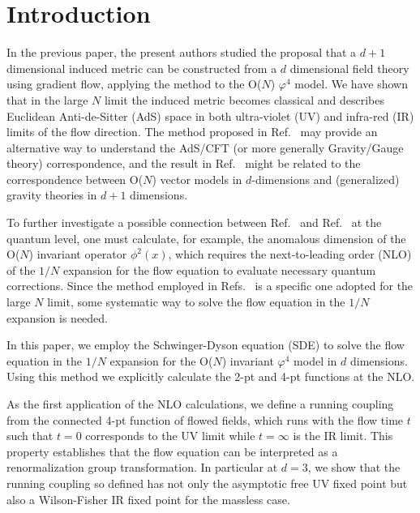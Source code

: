 \documentclass[preprint]{ptephy_v1}%
\begin{document}

\maketitle

\section{Introduction}
\label{sec:intro}
In the previous paper\cite{Aoki:2016ohw}, 
the present authors studied the proposal\cite{Aoki:2015dla} that a $d+1$ dimensional induced metric 
can be constructed from a $d$ dimensional field theory using gradient flow\cite{Narayanan:2006rf,Luscher:2010iy, Luscher:2009eq,Luscher:2013vga}, applying the method to  the O($N$) $\varphi^4$ model.
We have shown that in the large $N$ limit the induced metric becomes classical and describes Euclidean 
Anti-de-Sitter (AdS) space in both ultra-violet (UV) and infra-red (IR) 
limits of the flow direction.
The method proposed in Ref.~\cite{Aoki:2015dla} may provide an alternative way to understand 
the AdS/CFT (or more generally Gravity/Gauge theory) correspondence\cite{Maldacena:1997re},
and the result in Ref.~\cite{Aoki:2016ohw} might be related to the correspondence between  O($N$) vector models in $d$-dimensions and (generalized) gravity theories in $d+1$ dimensions\cite{Klebanov:2002ja}.

To further investigate a possible connection between Ref.~\cite{Aoki:2016ohw} 
and Ref.~\cite{Klebanov:2002ja} at the quantum level,
one must calculate, for example,  the anomalous dimension of the O($N$) invariant operator $\phi^2(x)$, which requires the next-to-leading order (NLO) of the $1/N$ expansion for the flow equation to evaluate necessary quantum corrections. Since  the method employed in Refs.~\cite{Aoki:2015dla,Aoki:2016ohw} is a specific one adopted for  the large $N$ limit, some systematic way to  solve the flow equation in the $1/N$ expansion is needed.  

In this paper, we employ the Schwinger-Dyson equation (SDE) to solve the flow equation in the $1/N$ expansion
for the O($N$) invariant $\varphi^4$ model in $d$ dimensions. Using this method we explicitly calculate the 2-pt and 4-pt functions at the NLO.

As the first application of the NLO calculations, we define a running coupling from
the connected 4-pt function of flowed fields, which  runs  with the flow time $t$ such that $t=0$ corresponds to the UV limit while $t=\infty$ is the IR limit. 
This property establishes that the flow equation can be interpreted as a renormalization group transformation.
In particular at $d=3$, we show that the running coupling so defined  has not only the asymptotic free UV fixed point but also  a Wilson-Fisher IR fixed point for the massless case. 
\end{document}

